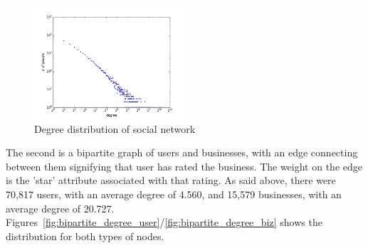 \documentclass[10pt]{article}
\begin{document}
\begin{figure}[ht]
  \centering
    \includegraphics[width=0.5\textwidth]{soc_degree_distribution.png}
  \caption{Degree distribution of social network}
  \label{fig:social_degree}
\end{figure}


The second is a bipartite graph of users and businesses, with an edge connecting between them signifying that user has rated the business.  The weight on the edge is the 'star' attribute associated with that rating.  As said above, there were 70,817 users, with an average degree of 4.560, and 15,579 businesses, with an average degree of 20.727. Figures~\ref{fig:bipartite_degree_user}/\ref{fig:bipartite_degree_biz} shows the distribution for both types of nodes.
\end{document}
